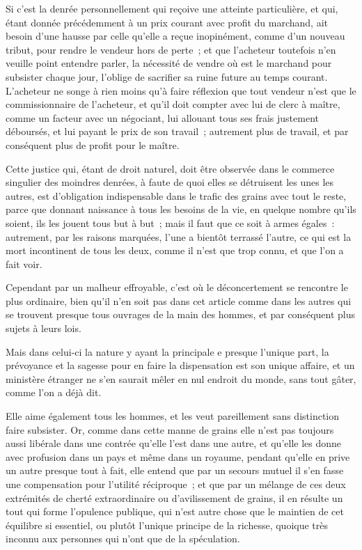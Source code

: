 \documentclass[french,twoside]{book} %
\begin{document}
Si c’est la denrée personnellement qui reçoive une atteinte particulière, et qui, étant donnée précédemment à un prix courant avec profit du marchand, ait besoin d’une hausse par celle qu’elle a reçue inopinément, comme d’un nouveau tribut, pour rendre le vendeur hors de perte ; et que l’acheteur toutefois n’en veuille point entendre parler, la nécessité de vendre où est le marchand pour subsister chaque jour, l’oblige de sacrifier sa ruine future au temps courant. L’acheteur ne songe à rien moins qu’à faire réflexion que tout vendeur n’est que le commissionnaire de l’acheteur, et qu’il doit compter avec lui de clerc à maître, comme un facteur avec un négociant, lui allouant tous ses frais justement déboursés, et lui payant le prix de son travail ; autrement plus de travail, et par conséquent plus de profit pour le maître.\par
Cette justice qui, étant de droit naturel, doit être observée dans le commerce singulier des moindres denrées, à faute de quoi elles se détruisent les unes les autres, est d’obligation indispensable dans le trafic des grains avec tout le reste, parce que donnant naissance à tous les besoins de la vie, en quelque nombre qu’ils soient, ils les jouent tous but à but ; mais il faut que ce soit à armes égales : autrement, par les raisons marquées, l’une a bientôt terrassé l’autre, ce qui est la mort incontinent de tous les deux, comme il n’est que trop connu, et que l’on a fait voir.\par
Cependant par un malheur effroyable, c’est où le déconcertement se rencontre le plus ordinaire, bien qu’il n’en soit pas dans cet article comme dans les autres qui se trouvent presque tous ouvrages de la main des hommes, et par conséquent plus sujets à leurs lois.\par
Mais dans celui-ci la nature y ayant la principale e presque l’unique part, la prévoyance et la sagesse pour en faire la dispensation est son unique affaire, et un ministère étranger ne s’en saurait mêler en nul endroit du monde, sans tout gâter, comme l’on a déjà dit.\par
Elle aime également tous les hommes, et les veut pareillement sans distinction faire subsister. Or, comme dans cette manne de grains elle n’est pas toujours aussi libérale dans une contrée qu’elle l’est dans une autre, et qu’elle les donne avec profusion dans un pays et même dans un royaume, pendant qu’elle en prive un autre presque tout à fait, elle entend que par un secours mutuel il s’en fasse une compensation pour l’utilité réciproque ; et que par un mélange de ces deux extrémités de cherté extraordinaire ou d’avilissement de grains, il en résulte un tout qui forme l’opulence publique, qui n’est autre chose que le maintien de cet équilibre si essentiel, ou plutôt l’unique principe de la richesse, quoique très inconnu aux personnes qui n’ont que de la spéculation.\par
\end{document}
